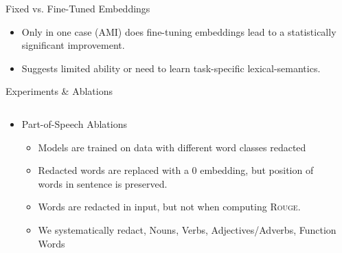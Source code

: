 \begin{frame}{Fixed vs. Fine-Tuned Embeddings}
\vspace{10pt}
\begin{itemize}
    \item Only in one case \alert<2>{(AMI)} does fine-tuning embeddings lead to a statistically significant improvement.
\vspace{10pt}
\item<3-> Suggests limited ability or need to learn task-specific 
    lexical-semantics.
\end{itemize}
\end{frame}




\begin{frame}{Experiments \& Ablations}
\begin{columns}
\begin{column}{0.65\textwidth}
\begin{itemize} 
    \item Part-of-Speech Ablations
    \begin{itemize}
        \item Models are trained on data with different word classes redacted
        \item Redacted words are replaced with a 0 embedding, but position
            of words in sentence is preserved. 
        \item Words are redacted in input, but not when computing \textsc{Rouge}.        
        \item We systematically redact, Nouns, Verbs, Adjectives/Adverbs, Function Words
    \end{itemize}
\end{itemize}
\end{column}

\begin{column}{0.3\textwidth}
\fbox{
\resizebox{0.95\textwidth}{!}{
\begin{minipage}{\textwidth}


\end{minipage}}}
\end{column}
\end{columns}
\end{frame}
